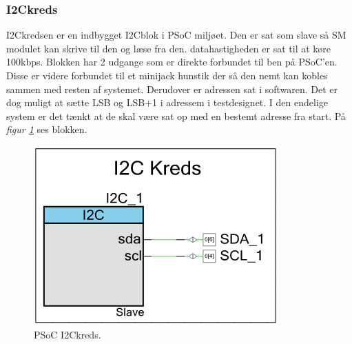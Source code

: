 \subsubsection{I2Ckreds}
I2Ckredsen er en indbygget I2Cblok i PSoC miljøet. Den er sat som slave så SM modulet kan skrive til den og læse fra den. datahastigheden er sat til at køre 100kbps. Blokken har 2 udgange som er direkte forbundet til ben på PSoC'en. Disse er videre forbundet til et minijack hunstik der så den nemt kan kobles sammen med resten af systemet. Derudover er adressen sat i softwaren. Det er dog muligt at sætte LSB og LSB+1 i adressem i testdesignet. I den endelige system er det tænkt at de skal være sat op med en bestemt adresse fra start. På \textit{figur \ref{fig:psoci2ckreds}} ses blokken.
\begin{figure}[H]
\centering
\includegraphics[scale=.5]{billeder/psoci2ckreds}
\caption{PSoC I2Ckreds.}
\label{fig:psoci2ckreds}
\end{figure}
